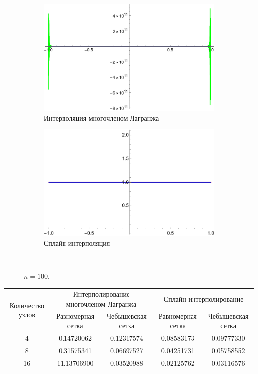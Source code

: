 \documentclass[12pt, a4paper]{article}
\begin{document}
	
	\begin{figure}[H]
		\centering
		\begin{subfigure}{0.4\textwidth}
			\includegraphics[width=\textwidth]{0_l100}
			\caption{Интерполяция многочленом Лагранжа}
		\end{subfigure}
		\hfill
		\begin{subfigure}{0.4\textwidth}
			\includegraphics[width=\textwidth]{0_s100}
			\caption{Сплайн-интерполяция}
		\end{subfigure}
		\hfill
		\\[0.5cm]
		\caption{$n = 100$.}
	\end{figure}
	
	
	\begin{table}[H]
		\centering
		\footnotesize
		\begin{tabular}{|c|c|c|c|c|}
			\hline
			\multirow{2}{5em}{Количество узлов} & \multicolumn{2}{|c|}{Интерполирование многочленом Лагранжа}&\multicolumn{2}{|c|}{Сплайн-интерполирование}\\
			\cline{2-5}
			&Равномерная сетка &Чебышевская сетка &Равномерная сетка&Чебышевская сетка\\
			\hline
			4& 0.14720062&0.12317574&0.08583173&0.09777330\\
			\hline
			8& 0.31575341&0.06697527&0.04251731&0.05758552\\
			\hline
			16& 11.13706900&0.03520988&0.02125762&0.03116576\\
			\hline
		\end{tabular}
	\end{table}
	
\end{document}
